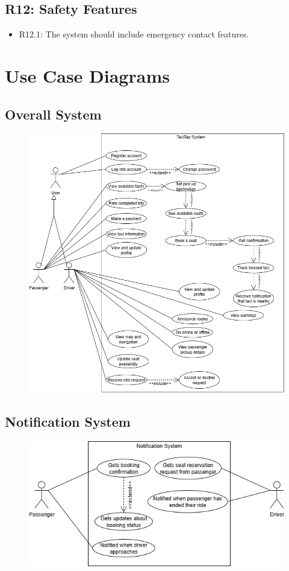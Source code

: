 \documentclass[a4paper,12pt]{article}
\begin{document}
\subsection*{R12: Safety Features}
\begin{itemize}
    \item R12.1: The system should include emergency contact features.
\end{itemize}

\section{Use Case Diagrams}
  \subsection*{Overall System}
    \begin{figure}[H]
      \centering
      \includegraphics[width=1\textwidth]{Overall System.png} 
    \end{figure}
    \subsection*{Notification System}
    \begin{figure}[H]
      \centering
      \includegraphics[width=1\textwidth]{Notification System.png} 
    \end{figure}
\end{document}
